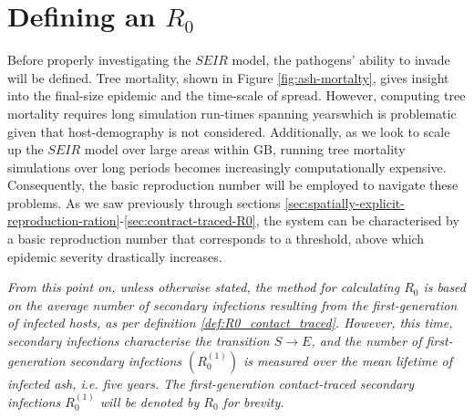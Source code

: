 \section{Defining an $R_0$}
\label{sec:SEIR-R0-definition}

Before properly investigating the $SEIR$ model, the pathogens' ability to invade will be defined.
Tree mortality, shown in Figure \ref{fig:ash-mortalty}, gives insight into the final-size epidemic and the time-scale of spread.
However, computing tree mortality requires long simulation run-times spanning years\textemdash which is problematic given that host-demography is not considered.
Additionally, as we look to scale up the $SEIR$ model over large areas within GB, running tree mortality simulations over long periods becomes increasingly computationally expensive.
Consequently, the basic reproduction number will be employed to navigate these problems.
As we saw previously through sections \ref{sec:spatially-explicit-reproduction-ration}-\ref{sec:contract-traced-R0}, the system can be characterised by a basic reproduction number that corresponds to a threshold, above which epidemic severity drastically increases.

\textit{From this point on, unless otherwise stated, the method for calculating $R_0$ is based on the average number of secondary infections resulting from the first-generation of infected hosts, as per definition \ref{def:R0_contact_traced}. However, this time, secondary infections characterise the transition $S\rightarrow E$, and the number of first-generation secondary infections $(R_0^{(1)})$ is measured over the mean lifetime of infected ash, i.e. five years.
The first-generation contact-traced secondary infections $R_0^{(1)}$ will be denoted by $R_0$ for brevity.}


